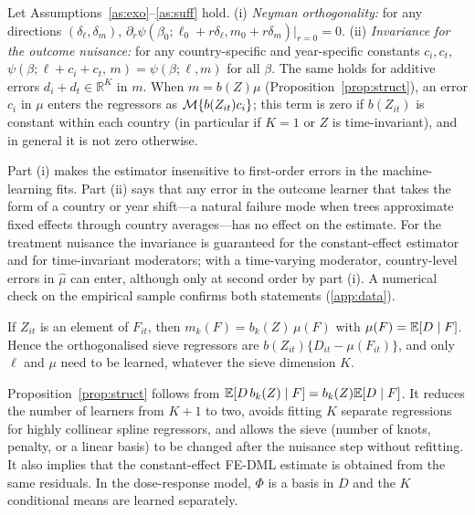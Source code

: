 \documentclass[preprint,12pt,authoryear]{elsarticle}
\begin{document}
\begin{proposition}\label{prop:orth}
Let Assumptions~\ref{as:exo}--\ref{as:suff} hold.
(i) \emph{Neyman orthogonality:} for any directions $(\delta_\ell,\delta_m)$, $\partial_r\psi(\beta_0;\ell_0+r\delta_\ell,m_0+r\delta_m)\big|_{r=0}=0$.
(ii) \emph{Invariance for the outcome nuisance:} for any country-specific and year-specific constants $c_i,c_t$, $\psi(\beta;\ell+c_i+c_t,\,m)=\psi(\beta;\ell,m)$ for all $\beta$. The same holds for additive errors $d_i+d_t\in\mathbb{R}^K$ in $m$. When $m=b(Z)\mu$ (Proposition~\ref{prop:struct}), an error $c_i$ in $\mu$ enters the regressors as $\mathcal{M}\{b(Z_{it})c_i\}$; this term is zero if $b(Z_{it})$ is constant within each country (in particular if $K=1$ or $Z$ is time-invariant), and in general it is not zero otherwise.
\end{proposition}

Part (i) makes the estimator insensitive to first-order errors in the machine-learning fits. Part (ii) says that any error in the outcome learner that takes the form of a country or year shift---a natural failure mode when trees approximate fixed effects through country averages---has no effect on the estimate. For the treatment nuisance the invariance is guaranteed for the constant-effect estimator and for time-invariant moderators; with a time-varying moderator, country-level errors in $\hat\mu$ can enter, although only at second order by part (i). A numerical check on the empirical sample confirms both statements (\ref{app:data}).

\begin{proposition}\label{prop:struct}
If $Z_{it}$ is an element of $F_{it}$, then $m_k(F)=b_k(Z)\,\mu(F)$ with $\mu(F)=\mathbb{E}[D\mid F]$. Hence the orthogonalised sieve regressors are $b(Z_{it})\{D_{it}-\mu(F_{it})\}$, and only $\ell$ and $\mu$ need to be learned, whatever the sieve dimension $K$.
\end{proposition}

Proposition~\ref{prop:struct} follows from $\mathbb{E}[D\,b_k(Z)\mid F]=b_k(Z)\mathbb{E}[D\mid F]$. It reduces the number of learners from $K+1$ to two, avoids fitting $K$ separate regressions for highly collinear spline regressors, and allows the sieve (number of knots, penalty, or a linear basis) to be changed after the nuisance step without refitting. It also implies that the constant-effect FE-DML estimate is obtained from the same residuals. In the dose-response model, $\Phi$ is a basis in $D$ and the $K$ conditional means are learned separately.
\end{document}
